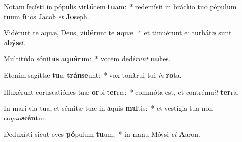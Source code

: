 \item Notam fecísti in pópulis vir\textbf{tú}tem \textbf{tu}am:~* redemísti in bráchio tuo pópulum tuum fílios Jacob \textit{et} \textbf{Jo}seph.
\item Vidérunt te aquæ, Deus, vi\textbf{dé}runt te \textbf{a}quæ:~* et timuérunt et turbátæ sunt \textit{a}\textbf{býs}si.
\item Multitúdo sóni\textbf{tus} a\textbf{quá}rum:~* vocem dedé\textit{runt} \textbf{nu}bes.
\item Etenim sagíttæ \textbf{tu}æ \textbf{tráns}\textbf{e}unt:~* vox tonítrui tui \textit{in} \textbf{ro}ta.
\item Illuxérunt coruscatiónes tuæ \textbf{or}bi \textbf{ter}ræ:~* commóta est, et contrému\textit{it} \textbf{ter}ra.
\item In mari via tua, et sémitæ tuæ in \textbf{a}quis \textbf{mul}tis:~* et vestígia tua non co\textit{gno}\textbf{scén}tur.
\item Deduxísti sicut oves \textbf{pó}pulum \textbf{tu}um,~* in manu Móysi \textit{et} \textbf{A}aron.
